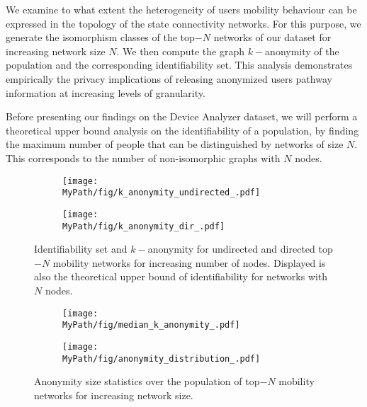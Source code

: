 We examine to what extent the heterogeneity of users mobility behaviour can be expressed in the topology of the state connectivity networks.
For this purpose, we generate the isomorphism classes of the top$-N$ networks of our dataset for increasing network size $ N $.
We then compute the graph $k-$anonymity of the population and the corresponding identifiability set.
This analysis demonstrates empirically the privacy implications of releasing anonymized users pathway information at increasing levels of granularity.

Before presenting our findings on the Device Analyzer dataset, we will perform a theoretical upper bound analysis on the identifiability of a population, by finding the maximum number of people that can be distinguished by networks of size $ N $.
This corresponds to the number of non-isomorphic graphs with $ N $ nodes.

\begin{figure*}[!t]
	\begin{subfigure}[t]{0.49\textwidth}
		\centering
		\texttt{[image: \\MyPath/fig/k\_anonymity\_undirected\_.pdf]}
		\caption{}
		\label{fig:k_an_un}
	\end{subfigure}%
	\begin{subfigure}[t]{0.49\textwidth}
		\centering
		\texttt{[image: \\MyPath/fig/k\_anonymity\_dir\_.pdf]}
		\caption{}
		\label{fig:k_an_dir}
	\end{subfigure}%
	\caption{{Identifiability set and $k-$anonymity for undirected and directed top$-N$ mobility networks for increasing number of nodes. Displayed is also the theoretical upper bound of identifiability for networks with $ N $ nodes.}
	}
	\label{fig:k_an}
\end{figure*}


\begin{figure*}[!t]
	\begin{subfigure}[t]{0.49\textwidth}
		\centering
		\texttt{[image: \\MyPath/fig/median\_k\_anonymity\_.pdf]}
		\caption{}
		\label{fig:k_an_med}
	\end{subfigure}
	\begin{subfigure}[t]{0.49\textwidth}
		\centering
		\texttt{[image: \\MyPath/fig/anonymity\_distribution\_.pdf]}
		\caption{}
		\label{fig:anon_distribution}
	\end{subfigure}
	\caption{{Anonymity size statistics over the population of top$-N$ mobility networks for increasing network size.}}
	\label{fig:k_an_stats}
\end{figure*}


